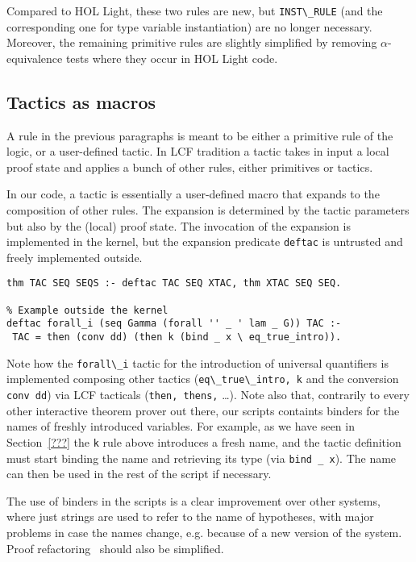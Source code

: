 \documentclass[preprint]{sigplanconf}
\begin{document}
Compared to HOL Light, these two rules are new, but \verb+INST\_RULE+ (and the corresponding one for type variable instantiation) are no longer necessary. Moreover, the remaining primitive rules are slightly simplified by removing $\alpha$-equivalence tests where they occur in HOL Light code.

\subsection{Tactics as macros}
A rule in the previous paragraphs is meant to be either a primitive rule of the logic, or a user-defined tactic. In LCF tradition a tactic takes in input a local proof state and applies a bunch of other rules, either primitives or tactics.

In our code, a tactic is essentially a user-defined macro that expands to the composition of other rules. The expansion is determined by the tactic parameters but also by the (local) proof state. The invocation of the expansion is implemented in the kernel, but the expansion predicate \verb+deftac+ is untrusted and freely implemented outside.

\begin{small}
\begin{verbatim}
thm TAC SEQ SEQS :- deftac TAC SEQ XTAC, thm XTAC SEQ SEQ.

% Example outside the kernel
deftac forall_i (seq Gamma (forall '' _ ' lam _ G)) TAC :-
 TAC = then (conv dd) (then k (bind _ x \ eq_true_intro)).
\end{verbatim}
\end{small}

Note how the \verb+forall\_i+ tactic for the introduction of universal quantifiers is implemented composing other tactics (\verb+eq\_true\_intro, k+ and the conversion \verb+conv dd+) via LCF tacticals (\verb+then, thens,+ \ldots). Note also that, contrarily to every other interactive theorem prover out there, our scripts containts binders for the names of freshly introduced variables. For example, as we have seen in Section~\ref{???} the \verb+k+ rule above introduces a fresh name, and the tactic definition must start binding the name and retrieving its type (via \verb+bind _ x+). The name can then be used in the rest of the script if necessary.

The use of binders in the scripts is a clear improvement over other systems, where just strings are used to refer to the name of hypotheses, with major problems in case the names change, e.g. because of a new version of the system. Proof refactoring~\cite{???} should also be simplified.
\end{document}
